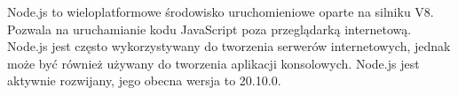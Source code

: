 Node.js to wieloplatformowe środowisko uruchomieniowe oparte na silniku V8. Pozwala na uruchamianie kodu JavaScript poza przeglądarką internetową. Node.js jest często wykorzystywany do tworzenia serwerów internetowych, jednak może być również używany do tworzenia aplikacji konsolowych. Node.js jest  aktywnie rozwijany, jego obecna wersja to 20.10.0. \autocite{nodejs}